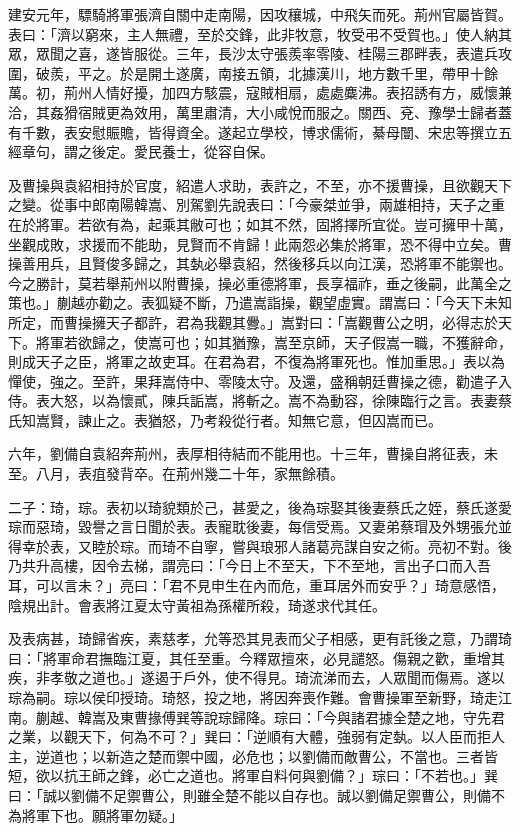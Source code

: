 \begin{pinyinscope}
建安元年，驃騎將軍張濟自關中走南陽，因攻穰城，中飛矢而死。荊州官屬皆賀。表曰：「濟以窮來，主人無禮，至於交鋒，此非牧意，牧受弔不受賀也。」使人納其眾，眾聞之喜，遂皆服從。三年，長沙太守張羨率零陵、桂陽三郡畔表，表遣兵攻圍，破羨，平之。於是開土遂廣，南接五領，北據漢川，地方數千里，帶甲十餘萬。初，荊州人情好擾，加四方駭震，寇賊相扇，處處麋沸。表招誘有方，威懷兼洽，其姦猾宿賊更為效用，萬里肅清，大小咸悅而服之。關西、兗、豫學士歸者蓋有千數，表安慰賑贍，皆得資全。遂起立學校，博求儒術，綦母闓、宋忠等撰立五經章句，謂之後定。愛民養士，從容自保。

及曹操與袁紹相持於官度，紹遣人求助，表許之，不至，亦不援曹操，且欲觀天下之變。從事中郎南陽韓嵩、別駕劉先說表曰：「今豪桀並爭，兩雄相持，天子之重在於將軍。若欲有為，起乘其敝可也；如其不然，固將擇所宜從。豈可擁甲十萬，坐觀成敗，求援而不能助，見賢而不肯歸！此兩怨必集於將軍，恐不得中立矣。曹操善用兵，且賢俊多歸之，其埶必舉袁紹，然後移兵以向江漢，恐將軍不能禦也。今之勝計，莫若舉荊州以附曹操，操必重德將軍，長享福祚，垂之後嗣，此萬全之策也。」蒯越亦勸之。表狐疑不斷，乃遣嵩詣操，觀望虛實。謂嵩曰：「今天下未知所定，而曹操擁天子都許，君為我觀其釁。」嵩對曰：「嵩觀曹公之明，必得志於天下。將軍若欲歸之，使嵩可也；如其猶豫，嵩至京師，天子假嵩一職，不獲辭命，則成天子之臣，將軍之故吏耳。在君為君，不復為將軍死也。惟加重思。」表以為憚使，強之。至許，果拜嵩侍中、零陵太守。及還，盛稱朝廷曹操之德，勸遣子入侍。表大怒，以為懷貳，陳兵詬嵩，將斬之。嵩不為動容，徐陳臨行之言。表妻蔡氏知嵩賢，諫止之。表猶怒，乃考殺從行者。知無它意，但囚嵩而已。

六年，劉備自袁紹奔荊州，表厚相待結而不能用也。十三年，曹操自將征表，未至。八月，表疽發背卒。在荊州幾二十年，家無餘積。

二子：琦，琮。表初以琦貌類於己，甚愛之，後為琮娶其後妻蔡氏之姪，蔡氏遂愛琮而惡琦，毀譽之言日聞於表。表寵耽後妻，每信受焉。又妻弟蔡瑁及外甥張允並得幸於表，又睦於琮。而琦不自寧，嘗與琅邪人諸葛亮謀自安之術。亮初不對。後乃共升高樓，因令去梯，謂亮曰：「今日上不至天，下不至地，言出子口而入吾耳，可以言未？」亮曰：「君不見申生在內而危，重耳居外而安乎？」琦意感悟，陰規出計。會表將江夏太守黃祖為孫權所殺，琦遂求代其任。

及表病甚，琦歸省疾，素慈孝，允等恐其見表而父子相感，更有託後之意，乃謂琦曰：「將軍命君撫臨江夏，其任至重。今釋眾擅來，必見譴怒。傷親之歡，重增其疾，非孝敬之道也。」遂遏于戶外，使不得見。琦流涕而去，人眾聞而傷焉。遂以琮為嗣。琮以侯印授琦。琦怒，投之地，將因奔喪作難。會曹操軍至新野，琦走江南。蒯越、韓嵩及東曹掾傅巽等說琮歸降。琮曰：「今與諸君據全楚之地，守先君之業，以觀天下，何為不可？」巽曰：「逆順有大體，強弱有定埶。以人臣而拒人主，逆道也；以新造之楚而禦中國，必危也；以劉備而敵曹公，不當也。三者皆短，欲以抗王師之鋒，必亡之道也。將軍自料何與劉備？」琮曰：「不若也。」巽曰：「誠以劉備不足禦曹公，則雖全楚不能以自存也。誠以劉備足禦曹公，則備不為將軍下也。願將軍勿疑。」


\end{pinyinscope}
